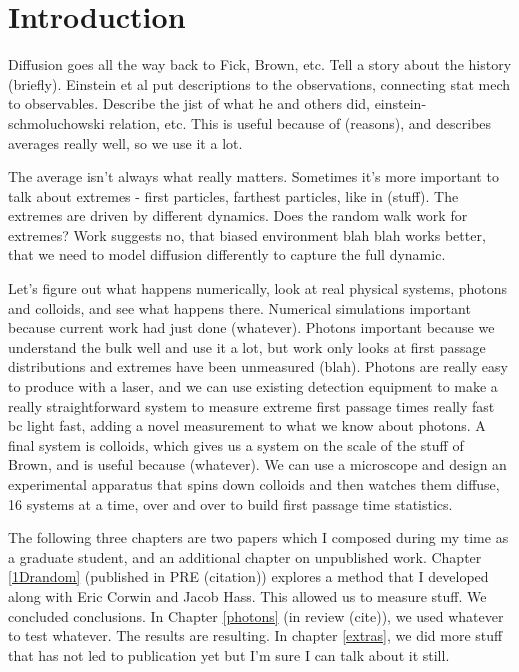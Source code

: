 \chapter{Introduction}

Diffusion goes all the way back to Fick, Brown, etc. Tell a story about the history (briefly). Einstein et al put descriptions to the observations, connecting stat mech to observables. Describe the jist of what he and others did, einstein-schmoluchowski relation, etc. This is useful because of (reasons), and describes averages really well, so we use it a lot.

The average isn't always what really matters. Sometimes it's more important to talk about extremes - first particles, farthest particles, like in (stuff). The extremes are driven by different dynamics. Does the random walk work for extremes? Work suggests no, that biased environment blah blah works better, that we need to model diffusion differently to capture the full dynamic.

Let's figure out what happens numerically, look at real physical systems, photons and colloids, and see what happens there. Numerical simulations important because current work had just done (whatever). Photons important because we understand the bulk well and use it a lot, but work only looks at first passage distributions and extremes have been unmeasured (blah). Photons are really easy to produce with a laser, and we can use existing detection equipment to make a really straightforward system to measure extreme first passage times really fast bc light fast, adding a novel measurement to what we know about photons. A final system is colloids, which gives us a system on the scale of the stuff of Brown, and is useful because (whatever). We can use a microscope and design an experimental apparatus that spins down colloids and then watches them diffuse, 16 systems at a time, over and over to build first passage time statistics.

The following three chapters are two papers which I composed during my time as a graduate student, and an additional chapter on unpublished work. Chapter \ref{1Drandom} (published in PRE (citation)) explores a method that I developed along with Eric Corwin and Jacob Hass. This allowed us to measure stuff. We concluded conclusions. In Chapter \ref{photons} (in review (cite)), we used whatever to test whatever. The results are resulting. In chapter \ref{extras}, we did more stuff that has not led to publication yet but I'm sure I can talk about it still.

